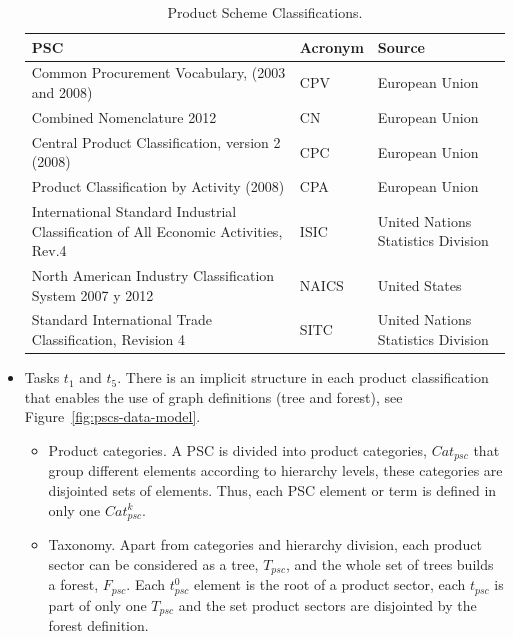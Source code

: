 \begin{itemize}
\begin{table}[!ht]
\renewcommand{\arraystretch}{1.3}
\begin{center}
\begin{tabular}[c]{|p{6cm}|l|p{6cm}|} 
\hline
  \textbf{PSC} &  \textbf{Acronym} & \textbf{Source} \\\hline
  Common Procurement Vocabulary, (2003 and 2008) & CPV & European Union \\ \hline
  Combined Nomenclature 2012 & CN & European Union \\ \hline
  Central Product Classification, version 2 (2008) & CPC & European Union \\ \hline
  Product Classification by Activity (2008) & CPA & European Union \\ \hline
  International Standard Industrial Classification of All Economic Activities, Rev.4 & ISIC & United Nations Statistics Division \\ \hline
  North American Industry Classification System 2007 y 2012 & NAICS & United States \\ \hline
  Standard International Trade Classification, Revision 4 & SITC & United Nations Statistics Division \\ \hline
\hline
\end{tabular}
\caption{Product Scheme Classifications.}\label{table:pscs-ld}
  \end{center}
\end{table} 

 \item Tasks $t_1$ and $t_5$. There is an implicit structure in each product classification 
 that enables the use of graph definitions (tree and forest), see Figure~\ref{fig:pscs-data-model}.
 \begin{itemize}
  \item Product categories. A PSC is divided into product categories, $Cat_{psc}$ that group different elements according to hierarchy levels, 
  these categories are disjointed sets of elements. Thus, each PSC element or term is defined in only one $Cat^k_{psc}$.
  \item Taxonomy. Apart from categories and hierarchy division, each product sector can be considered as a tree, $T_{psc}$, 
  and the whole set of trees builds a forest, $F_{psc}$. Each $t^0_{psc}$ element is the root of a product sector, each $t_{psc}$ 
  is part of only one $T_{psc}$ and the set product sectors are disjointed by the forest definition.
 \end{itemize}
 

\end{itemize}
